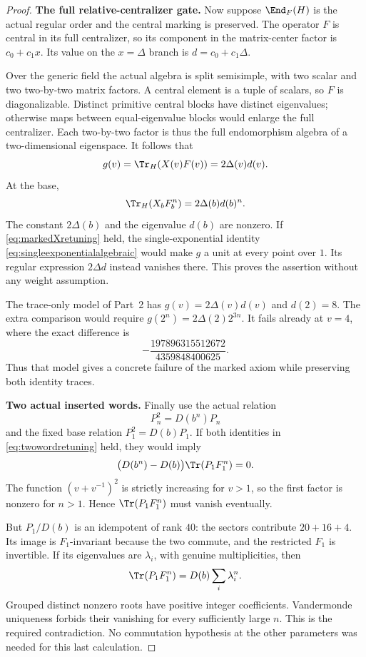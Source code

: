 \begin{proof}
\par\smallskip\noindent\textbf{The full relative-centralizer gate.}\quad
Now suppose $\End_F(H)$ is the actual regular order
and the central marking is preserved.
The operator $F$ is central in its full centralizer,
so its component in the matrix-center factor is
$c_0+c_1x$.
Its value on the $x=\Delta$ branch is
$d=c_0+c_1\Delta$.

Over the generic field the actual algebra is split
semisimple, with two scalar and two two-by-two matrix
factors.
A central element is a tuple of scalars, so $F$ is
diagonalizable.
Distinct primitive central blocks have distinct eigenvalues;
otherwise maps between equal-eigenvalue blocks would
enlarge the full centralizer.
Each two-by-two factor is thus the full endomorphism
algebra of a two-dimensional eigenspace.
It follows that
\[
 g(v)=\Tr_H(X(v)F(v))=2\Delta(v)d(v).
\]
At the base,
\[
 \Tr_H(X_bF_b^n)=2\Delta(b)d(b)^n.
\]
The constant $2\Delta(b)$ and the eigenvalue $d(b)$
are nonzero.
If \eqref{eq:markedXretuning} held, the single-exponential
identity \eqref{eq:singleexponentialalgebraic} would make
$g$ a unit at every point over $1$.
Its regular expression $2\Delta d$ instead vanishes there.
This proves the assertion without any weight assumption.

The trace-only model of Part~2 has
$g(v)=2\Delta(v)d(v)$ and $d(2)=8$.
The extra comparison would require
$g(2^n)=2\Delta(2)2^{3n}$.
It fails already at $v=4$, where the exact difference is
\[
 -\frac{197896315512672}{4359848400625}.
\]
Thus that model gives a concrete failure of the marked
axiom while preserving both identity traces.

\par\smallskip\noindent\textbf{Two actual inserted words.}\quad
Finally use the actual relation
\[
 P_n^2=D(b^n)P_n
\]
and the fixed base relation $P_1^2=D(b)P_1$.
If both identities in \eqref{eq:twowordretuning} held,
they would imply
\[
 \bigl(D(b^n)-D(b)\bigr)\Tr(P_1F_1^n)=0.
\]
The function $(v+v^{-1})^2$ is strictly increasing
for $v>1$, so the first factor is nonzero for $n>1$.
Hence $\Tr(P_1F_1^n)$ must vanish eventually.

But $P_1/D(b)$ is an idempotent of rank $40$:
the sectors contribute $20+16+4$.
Its image is $F_1$-invariant because the two commute,
and the restricted $F_1$ is invertible.
If its eigenvalues are $\lambda_i$, with genuine
multiplicities, then
\[
 \Tr(P_1F_1^n)=D(b)\sum_i\lambda_i^n.
\]
Grouped distinct nonzero roots have positive integer
coefficients.
Vandermonde uniqueness forbids their vanishing for
every sufficiently large $n$.
This is the required contradiction.
No commutation hypothesis at the other parameters
was needed for this last calculation.
\end{proof}


